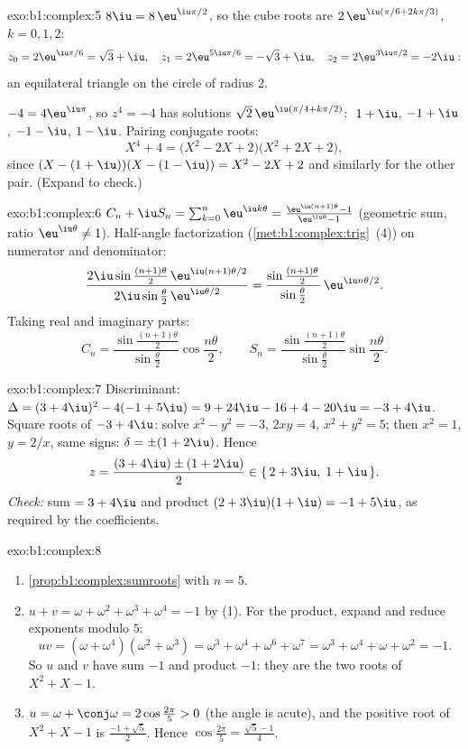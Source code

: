 \begin{solution}{exo:b1:complex:5}
$8\iu = 8\,\eu^{\iu\pi/2}$, so the cube roots are $2\,\eu^{\iu(\pi/6 +
2k\pi/3)}$, $k = 0, 1, 2$:
\[
z_0 = 2\eu^{\iu\pi/6} = \sqrt 3 + \iu,\quad
z_1 = 2\eu^{5\iu\pi/6} = -\sqrt 3 + \iu,\quad
z_2 = 2\eu^{3\iu\pi/2} = -2\iu :
\]
an equilateral triangle on the circle of radius $2$.

$-4 = 4\eu^{\iu\pi}$, so $z^4 = -4$ has solutions $\sqrt 2\,
\eu^{\iu(\pi/4 + k\pi/2)}$: $\;1 + \iu$, $-1 + \iu$, $-1 - \iu$,
$1 - \iu$. Pairing conjugate roots:
\[
X^4 + 4 = \bigl(X^2 - 2X + 2\bigr)\bigl(X^2 + 2X + 2\bigr),
\]
since $(X - (1+\iu))(X - (1-\iu)) = X^2 - 2X + 2$ and similarly for
the other pair. (Expand to check.)
\end{solution}

\begin{solution}{exo:b1:complex:6}
$C_n + \iu S_n = \sum_{k=0}^{n} \eu^{\iu k\theta} =
\frac{\eu^{\iu(n+1)\theta} - 1}{\eu^{\iu\theta} - 1}$ (geometric sum,
ratio $\eu^{\iu\theta} \neq 1$). Half-angle factorization
(\cref{met:b1:complex:trig}~(4)) on numerator and denominator:
\[
\frac{2\iu\sin\frac{(n+1)\theta}{2}\, \eu^{\iu(n+1)\theta/2}}
{2\iu\sin\frac{\theta}{2}\, \eu^{\iu\theta/2}}
= \frac{\sin\frac{(n+1)\theta}{2}}{\sin\frac{\theta}{2}}\,
\eu^{\iu n\theta/2}.
\]
Taking real and imaginary parts:
\[
C_n = \frac{\sin\frac{(n+1)\theta}{2}}{\sin\frac{\theta}{2}}
\cos\frac{n\theta}{2},
\qquad
S_n = \frac{\sin\frac{(n+1)\theta}{2}}{\sin\frac{\theta}{2}}
\sin\frac{n\theta}{2}.
\]
\end{solution}

\begin{solution}{exo:b1:complex:7}
Discriminant: $\Delta = (3 + 4\iu)^2 - 4(-1 + 5\iu) = 9 + 24\iu - 16 +
4 - 20\iu = -3 + 4\iu$. Square roots of $-3 + 4\iu$: solve $x^2 - y^2
= -3$, $2xy = 4$, $x^2 + y^2 = 5$; then $x^2 = 1$, $y = 2/x$, same
signs: $\delta = \pm(1 + 2\iu)$. Hence
\[
z = \frac{(3 + 4\iu) \pm (1 + 2\iu)}{2}
\in \{\, 2 + 3\iu,\; 1 + \iu \,\}.
\]
\emph{Check:} sum $= 3 + 4\iu$ and product $(2+3\iu)(1+\iu) = -1 +
5\iu$, as required by the coefficients.
\end{solution}

\begin{solution}{exo:b1:complex:8}
\begin{enumerate}
  \item \cref{prop:b1:complex:sumroots} with $n = 5$.
  \item $u + v = \omega + \omega^2 + \omega^3 + \omega^4 = -1$ by (1).
        For the product, expand and reduce exponents modulo $5$:
        \[
        uv = (\omega + \omega^4)(\omega^2 + \omega^3)
        = \omega^3 + \omega^4 + \omega^6 + \omega^7
        = \omega^3 + \omega^4 + \omega + \omega^2 = -1 .
        \]
        So $u$ and $v$ have sum $-1$ and product $-1$: they are the
        two roots of $X^2 + X - 1$.
  \item $u = \omega + \conj\omega = 2\cos\frac{2\pi}{5} > 0$ (the
        angle is acute), and the positive root of $X^2 + X - 1$ is
        $\frac{-1 + \sqrt 5}{2}$. Hence $\cos\frac{2\pi}{5} =
        \frac{\sqrt 5 - 1}{4}$.
\end{enumerate}
\end{solution}

